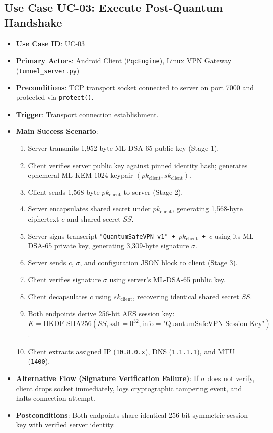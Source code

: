 \subsection{Use Case UC-03: Execute Post-Quantum Handshake}
\begin{itemize}
    \item \textbf{Use Case ID}: UC-03
    \item \textbf{Primary Actors}: Android Client (\texttt{PqcEngine}), Linux VPN Gateway (\texttt{tunnel\_server.py})
    \item \textbf{Preconditions}: TCP transport socket connected to server on port 7000 and protected via \texttt{protect()}.
    \item \textbf{Trigger}: Transport connection establishment.
    \item \textbf{Main Success Scenario}:
    \begin{enumerate}
        \item Server transmits 1,952-byte ML-DSA-65 public key (Stage 1).
        \item Client verifies server public key against pinned identity hash; generates ephemeral ML-KEM-1024 keypair $(pk_{\text{client}}, sk_{\text{client}})$.
        \item Client sends 1,568-byte $pk_{\text{client}}$ to server (Stage 2).
        \item Server encapsulates shared secret under $pk_{\text{client}}$, generating 1,568-byte ciphertext $c$ and shared secret $SS$.
        \item Server signs transcript \texttt{"QuantumSafeVPN-v1" + $pk_{\text{client}}$ + $c$} using its ML-DSA-65 private key, generating 3,309-byte signature $\sigma$.
        \item Server sends $c$, $\sigma$, and configuration JSON block to client (Stage 3).
        \item Client verifies signature $\sigma$ using server's ML-DSA-65 public key.
        \item Client decapsulates $c$ using $sk_{\text{client}}$, recovering identical shared secret $SS$.
        \item Both endpoints derive 256-bit AES session key: $K = \text{HKDF-SHA256}(SS, \text{salt}=0^{32}, \text{info}=\text{"QuantumSafeVPN-Session-Key"})$.
        \item Client extracts assigned IP (\texttt{10.8.0.x}), DNS (\texttt{1.1.1.1}), and MTU (\texttt{1400}).
    \end{enumerate}
    \item \textbf{Alternative Flow (Signature Verification Failure)}: If $\sigma$ does not verify, client drops socket immediately, logs cryptographic tampering event, and halts connection attempt.
    \item \textbf{Postconditions}: Both endpoints share identical 256-bit symmetric session key with verified server identity.
\end{itemize}


